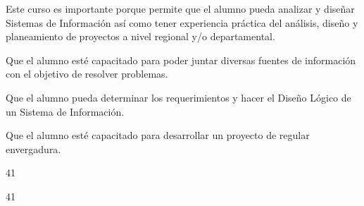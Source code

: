 \begin{syllabus}


\begin{justification}
Este curso es importante porque permite que el alumno pueda analizar y diseñar Sistemas de Información así como tener experiencia práctica del análisis, diseño y planeamiento de proyectos a nivel regional y/o departamental.
\end{justification}

\begin{goals}
\item Que el alumno esté capacitado para poder juntar diversas fuentes de información con el objetivo de resolver problemas.
\item Que el alumno pueda determinar los requerimientos y hacer el Diseño Lógico de un Sistema de Información.
\item Que el alumno esté capacitado para desarrollar un proyecto de regular envergadura.
\end{goals}

\begin{outcomes}
\end{outcomes}

\begin{unit}{\LUSEVENTWODef}{\LUSEVENTWOBib}{4}{1}
\begin{topics}
      \item \OMCONEOHTopicTWOxONEOHxONEOH
      \item \TDSSIXTopicTHREExSIXxONE
      \item \TDSSIXTopicTHREExSIXxTWO
      \item \TDSEIGHTTopicTHREExEIGHTxONE
\end{topics}
      \LUSEVENTWOGoal
\end{unit}

\begin{unit}{\LUSEVENTHREEDef}{\LUSEVENTHREEBib}{4}{1}
   \begin{topics}
	\item \OMCEIGHTTopicTWOxEIGHTxONE
	\item \OMCEIGHTTopicTWOxEIGHTxTWO
	\item \OMCEIGHTTopicTWOxEIGHTxTHREE
	\item \OMCEIGHTTopicTWOxEIGHTxFOUR
	\item \OMCEIGHTTopicTWOxEIGHTxFIVE
	\item \OMCEIGHTTopicTWOxEIGHTxSEVEN
	\item \TDSSEVENTopicTHREExSEVENxONEONE
   \end{topics}
	\LUSEVENTHREEGoal
\end{unit}


\end{syllabus}
